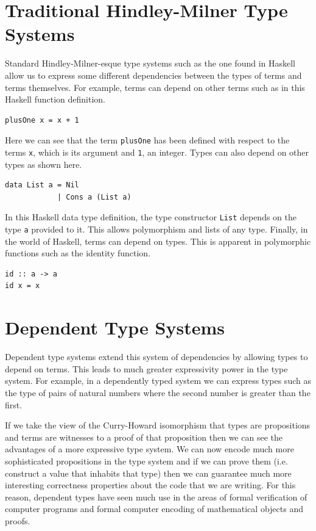 \documentclass[a4paper, notitlepage]{report}
\begin{document}
\section{Traditional Hindley-Milner Type Systems}
\label{sec:org9b3a341}
Standard Hindley-Milner-esque type systems such as the one found in Haskell
allow us to express some different dependencies between the types of terms and
terms themselves. For example, terms can depend on other terms such as in this
Haskell function definition.

\begin{verbatim}
plusOne x = x + 1
\end{verbatim}

Here we can see that the term \texttt{plusOne} has been defined with respect to the
terms \texttt{x}, which is its argument and \texttt{1}, an integer. Types can also depend on
other types as shown here.

\begin{verbatim}
data List a = Nil
            | Cons a (List a)
\end{verbatim}

In this Haskell data type definition, the type constructor \texttt{List} depends on the
type \texttt{a} provided to it. This allows polymorphism and lists of any type.
Finally, in the world of Haskell, terms can depend on types. This is apparent in
polymorphic functions such as the identity function.

\begin{verbatim}
id :: a -> a
id x = x
\end{verbatim}

\section{Dependent Type Systems}
\label{sec:org45240ce}
Dependent type systems extend this system of dependencies by allowing types to
depend on terms. This leads to much greater expressivity power in the type
system. For example, in a dependently typed system we can express types such as
the type of pairs of natural numbers where the second number is greater than the
first.

If we take the view of the Curry-Howard isomorphism that types are propositions
and terms are witnesses to a proof of that proposition then we can see the
advantages of a more expressive type system. We can now encode much more
sophisticated propositions in the type system and if we can prove them (i.e.
construct a value that inhabits that type) then we can guarantee much more
interesting correctness properties about the code that we are writing. For this
reason, dependent types have seen much use in the areas of formal verification
of computer programs and formal computer encoding of mathematical objects and
proofs.
\end{document}
